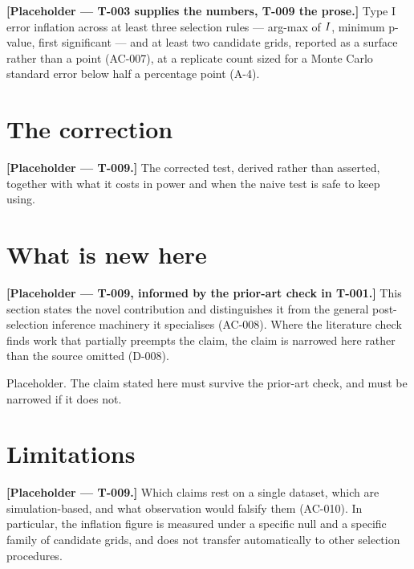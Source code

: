 \documentclass[11pt,a4paper]{article}
\begin{document}
\textbf{[Placeholder --- T-003 supplies the numbers, T-009 the prose.]}
Type I error inflation across at least three selection rules --- arg-max of
$I$, minimum p-value, first significant --- and at least two candidate
grids, reported as a surface rather than a point (AC-007), at a replicate count
sized for a Monte Carlo standard error below half a percentage point (A-4).

\section{The correction\CONTRIBUTION}
\label{sec:correction}

\textbf{[Placeholder --- T-009.]} The corrected test, derived rather than
asserted, together with what it costs in power and when the naive test is safe
to keep using.

\section{What is new here\CONTRIBUTION}
\label{sec:new}

\textbf{[Placeholder --- T-009, informed by the prior-art check in T-001.]}
This section states the novel contribution and distinguishes it from the general
post-selection inference machinery it specialises (AC-008). Where the literature
check finds work that partially preempts the claim, the claim is narrowed here
rather than the source omitted (D-008).

\begin{keyinsight}
Placeholder. The claim stated here must survive the prior-art check, and must be
narrowed if it does not.
\end{keyinsight}

\section{Limitations\LIMITATIONS}
\label{sec:limits}

\textbf{[Placeholder --- T-009.]} Which claims rest on a single dataset, which
are simulation-based, and what observation would falsify them (AC-010). In
particular, the inflation figure is measured under a specific null and a specific
family of candidate grids, and does not transfer automatically to other
selection procedures.
\end{document}
